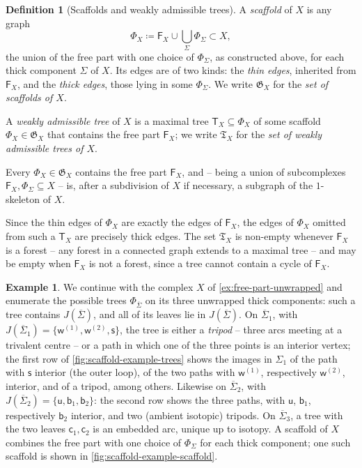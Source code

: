 \documentclass[reqno]{amsart}
\theoremstyle{definition}
\newtheorem{definition}[theorem]{Definition}
\newtheorem{example}[theorem]{Example}
\newcommand\sfF{\mathsf{F}}
\newcommand\sfT{\mathsf{T}}
\newcommand\sfb{\mathsf{b}}
\newcommand\sfc{\mathsf{c}}
\newcommand\sfs{\mathsf{s}}
\newcommand\sfu{\mathsf{u}}
\newcommand\sfw{\mathsf{w}}
\renewcommand{\bar}{\overline}
\numberwithin{equation}{section}
\begin{document}
\begin{definition}[Scaffolds and weakly admissible trees]
\label{def:scaffold}
A \emph{scaffold} of \(X\) is any graph
\[
\Phi_X \coloneqq \mathsf{F}_X \cup\bigcup_{\Sigma}\Phi_\Sigma\subset X,
\]
the union of the free part with one choice of \(\Phi_\Sigma\), as
constructed above, for each thick component \(\Sigma\) of \(X\). Its edges are of two kinds:
the \emph{thin edges}, inherited from \(\mathsf{F}_X\), and the
\emph{thick edges}, those lying in some \(\Phi_\Sigma\). We write
\(\mathfrak{G}_X\) for the \emph{set of scaffolds of \(X\)}.

A \emph{weakly admissible tree} of \(X\) is a maximal tree
\(\sfT_X\subseteq\Phi_X\) of some scaffold \(\Phi_X\in\mathfrak{G}_X\)
that contains the free part \(\sfF_X\); we write
\(\mathfrak{T}_X\) for the \emph{set of weakly admissible trees of \(X\)}.
\end{definition}

Every \(\Phi_X\in\mathfrak{G}_X\) contains the free part
\(\mathsf{F}_X\), and -- being a union of subcomplexes
\(\mathsf{F}_X,\Phi_\Sigma\subseteq X\) -- is, after a subdivision
of \(X\) if necessary, a subgraph of the \(1\)-skeleton of \(X\).

Since the thin edges of \(\Phi_X\) are exactly the edges of
\(\mathsf{F}_X\), the edges of \(\Phi_X\) omitted from such a
\(\sfT_X\) are precisely thick edges. The set \(\mathfrak{T}_X\) is
non-empty whenever \(\mathsf{F}_X\) is a forest -- any forest in a
connected graph extends to a maximal tree -- and may be empty when
\(\mathsf{F}_X\) is not a forest, since a tree cannot contain a
cycle of \(\mathsf{F}_X\).

\begin{example}\label{ex:scaffold-example}
We continue with the complex \(X\) of
\cref{ex:free-part-unwrapped} and enumerate the possible trees
\(\Phi_{\bar{\Sigma}}\) on its three unwrapped thick
components: such a tree contains \(J(\bar{\Sigma})\), and
all of its leaves lie in \(J(\bar{\Sigma})\). On
\(\bar{\Sigma}_1\), with
\(J(\bar{\Sigma}_1)=\{\sfw^{(1)},\sfw^{(2)},\sfs\}\), the tree is
either a \emph{tripod} -- three arcs meeting at a trivalent
centre -- or a path in which one of the three points is an
interior vertex; the first row of
\cref{fig:scaffold-example-trees} shows the images in
\(\Sigma_1\) of the path with \(\sfs\) interior (the outer loop),
of the two paths with \(\sfw^{(1)}\), respectively \(\sfw^{(2)}\),
interior, and of a tripod, among others. Likewise on
\(\bar{\Sigma}_2\), with
\(J(\bar{\Sigma}_2)=\{\sfu,\sfb_1,\sfb_2\}\): the second row shows
the three paths, with \(\sfu\), \(\sfb_1\), respectively \(\sfb_2\)
interior, and two (ambient isotopic) tripods. On
\(\bar{\Sigma}_3\), a tree with the two leaves
\(\sfc_1,\sfc_2\) is an embedded arc, unique up to isotopy. A
scaffold of \(X\) combines the free part with one choice of
\(\Phi_\Sigma\) for each thick component; one such scaffold is
shown in \cref{fig:scaffold-example-scaffold}.
\end{example}
\end{document}
